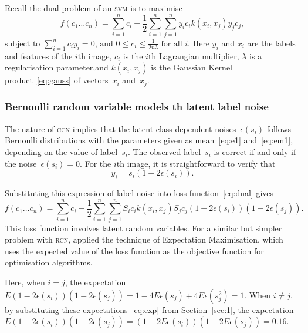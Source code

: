 \documentclass[12pt]{article} %
\begin{document}
Recall the dual problem of an \textsc{svm} is to maximise
\begin{equation}
   f(c_{1}\ldots c_{n})=\sum _{i=1}^{n}c_{i}-{\frac {1}{2}}\sum _{i=1}^{n}\sum _{j=1}^{n}y_{i}c_{i}k(x_{i},x_{j})y_{j}c_{j}, \label{eq:dual}
\end{equation}
\begin{math}
{\text{subject to }}\sum _{i=1}^{n}c_{i}y_{i}=0,\,{\text{and }}0\leq c_{i}\leq {\frac {1}{2n\lambda }}\;{\text{for all }}i.
\end{math}
Here $y_i$ and $x_i$ are the labels and features of the $i$th image, $c_i$ is the $i$th Lagrangian multiplier, $\lambda$ is a regularisation parameter,and $k(x_i,x_j)$ is the Gaussian Kernel product~\eqref{eq:gauss} of vectors~$x_i$ and~$x_j$.

\subsubsection{Bernoulli random variable models th latent label noise}
The nature of \textsc{ccn} implies that the latent class-dependent noises~$\epsilon(s_i)$ follows Bernoulli distributions with the parameters given as mean~\eqref{eq:e1} and~\eqref{eq:em1}, depending on the value of label~$s_i$. The observed label~$s_i$ is correct if and only if the noise~$\epsilon(s_i)=0$. For the $i$th image, it is straightforward to verify that
\begin{equation*}
y_i=s_i(1-2\epsilon(s_i)).
\end{equation*}

Substituting this expression of label noise into loss function~\eqref{eq:dual} gives
\begin{equation}
   f(c_{1}\ldots c_{n})=\sum _{i=1}^{n}c_{i}-{\frac {1}{2}}\sum _{i=1}^{n}\sum _{j=1}^{n}S_{i}c_{i}k(x_{i},x_{j})S_{j}c_{j}(1-2\epsilon(s_i))(1-2\epsilon(s_j)). \label{eq:dual2}
\end{equation}
This loss function involves latent random variables. For a similar  but simpler problem with \textsc{rcn}, \citet{pmlr-v20-biggio11} applied the technique of Expectation Maximisation, which uses the expected value of the loss function as the objective function for optimisation algorithms.

Here, when $i=j$, the expectation~$E(1-2\epsilon(s_i))(1-2\epsilon(s_j))=1-4E\epsilon(s_j)+4E\epsilon(s_j^2)=1$.
When $i\neq j$, by substituting these expectations~\eqref{eq:exp} from Section~\ref{sec:1}, the expectation~$E(1-2\epsilon(s_i))(1-2\epsilon(s_j))=(1-2E\epsilon(s_i))(1-2E\epsilon(s_j))=0.16$.
\end{document}
